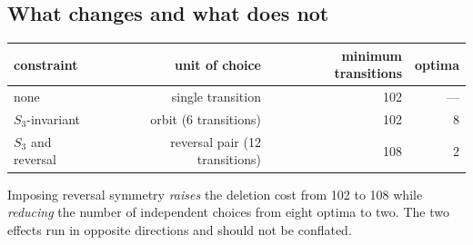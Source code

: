 \subsection*{What changes and what does not}

\begin{center}
\begin{tabular}{lrrr}
\toprule
constraint & unit of choice & minimum transitions & optima \\
\midrule
none & single transition & 102 & --- \\
\(S_3\)-invariant & orbit (6 transitions) & 102 & 8 \\
\(S_3\) and reversal & reversal pair (12 transitions) & 108 & 2 \\
\bottomrule
\end{tabular}
\end{center}

Imposing reversal symmetry \emph{raises} the deletion cost from 102 to 108
while \emph{reducing} the number of independent choices from eight optima to
two. The two effects run in opposite directions and should not be conflated.
